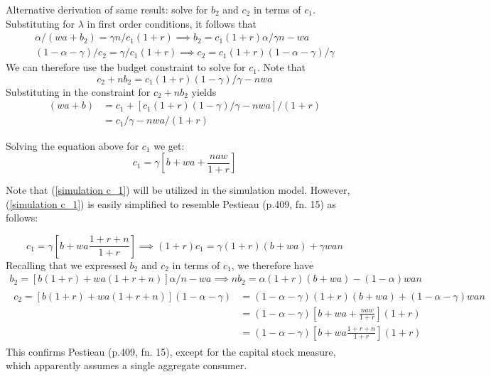 \documentclass{article}
\begin{document}
Alternative derivation of same result: solve for $b_{2}$ and $c_{2}$ in terms of $c_{1}$.\\
Substituting for $\lambda$ in first order conditions, it follows that
\begin{gather}
\alpha/(wa+b_{2}) = \gamma n/ c_{1} (1+r) \implies b_{2} = c_{1} (1+r) \alpha /\gamma n - wa
\\
(1-\alpha-\gamma)/ c_{2} = \gamma / c_{1} (1+r)  \implies  c_{2} = c_{1}(1+r) (1-\alpha-\gamma)/\gamma
\end{gather}
We can therefore use the budget constraint to solve for $c_{1}$.
Note that
\begin{equation}
c_{2} + n b_{2} = c_{1}(1+r)(1-\gamma)/\gamma - nwa
\end{equation}
Substituting in the constraint for $c_{2} + n b_{2}$ yields
\begin{equation}
\begin{split}
(w a + b)
&= c_{1} + [c_{1}(1+r)(1-\gamma)/\gamma - nwa]/(1+r)
\\
&= c_{1}/\gamma - nwa/(1+r)
\end{split}
\end{equation}

Solving the equation above for $c_{1}$ we get:
\begin{equation}\label{simulation c_1}
c_{1} = \gamma[b + wa + \frac{naw}{1+r}]
\end{equation}

Note that (\ref{simulation c_1}) will be utilized in the simulation model.  However, (\ref{simulation c_1}) is easily simplified to resemble Pestieau (p.409, fn. 15) as follows:

\begin{equation}\label{opt c1 a}
c_{1} = \gamma[b + wa\frac{1+r+n} {1+r}] \implies
(1+r)c_{1} = \gamma(1+r)(b + wa) + \gamma wan
\end{equation}
Recalling that we expressed $b_{2}$ and $c_{2}$ in terms of $c_{1}$, we therefore have
\begin{gather}
b_{2} =  [b(1+r) + wa(1+r+n)] \alpha /n - wa \implies nb_{2} = \alpha(1+r)(b+wa) - (1-\alpha)wan
\\
\begin{split}
c_{2} = [b(1+r) + wa(1+r+n)] (1-\alpha-\gamma) &= (1-\alpha-\gamma)(1+r)(b+wa) + (1-\alpha-\gamma)wan
\\
&= (1-\alpha -\gamma)[b+wa+\frac{naw}{1+r}](1+r)
\\
&= (1-\alpha -\gamma)[b+wa\frac{1+r+n}{1+r}](1+r)
\end{split}
\end{gather}
This confirms Pestieau (p.409, fn. 15), except for the capital stock measure,
which apparently assumes a single aggregate consumer.\newline
\end{document}
